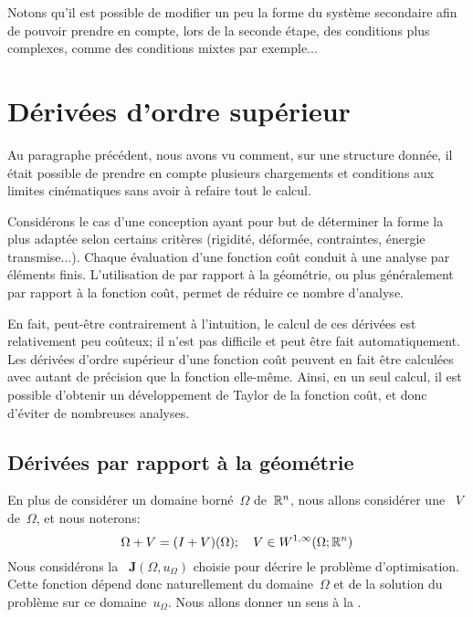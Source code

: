 Notons qu'il est possible de modifier un peu la forme du système secondaire afin de pouvoir prendre en compte, lors de la seconde étape, des conditions plus complexes, comme des conditions mixtes par exemple...


\medskip
\section{Dérivées d'ordre supérieur}\label{Sec-Deriv}

Au paragraphe précédent, nous avons vu comment, sur une structure donnée, il était possible de prendre en compte plusieurs chargements et conditions aux limites cinématiques sans avoir à refaire tout le calcul.


\medskip
Considérons le cas d'une conception ayant pour but de déterminer la forme la plus adaptée selon certains critères (rigidité, déformée, contraintes, énergie transmise...). Chaque évaluation d'une fonction coût conduit à une analyse par éléments finis. L'utilisation de  par rapport à la géométrie, ou plus généralement par rapport à la fonction coût, permet de réduire ce nombre d'analyse.

En fait, peut-être contrairement à l'intuition, le calcul de ces dérivées est relativement peu coûteux; il n'est pas difficile et peut être fait automatiquement. Les dérivées d'ordre supérieur d'une fonction coût peuvent en fait être calculées avec autant de précision que la fonction elle-même. Ainsi, en un seul calcul, il est possible d'obtenir un développement de Taylor de la fonction coût, et donc d'éviter de nombreuses analyses.

\medskip
\subsection{Dérivées par rapport à la géométrie}

En plus de considérer un domaine borné~$\Omega$ de~$\mathbb R^n$, nous allons considérer une ~$V$ de~$\Omega$, et nous noterons:
\begin{equation} \Omega + V = (I+V)(\Omega);\quad V\in W^{1,\infty}(\Omega;\mathbb R^n) \end{equation}
\medskipvm
Nous considérons la ~${\mathbf J}(\Omega, u_\Omega)$ choisie pour décrire le problème d'optimisation. Cette fonction dépend donc naturellement du domaine~$\Omega$ et de la solution du problème sur ce domaine~$u_\Omega$. Nous allons donner un sens à la .

